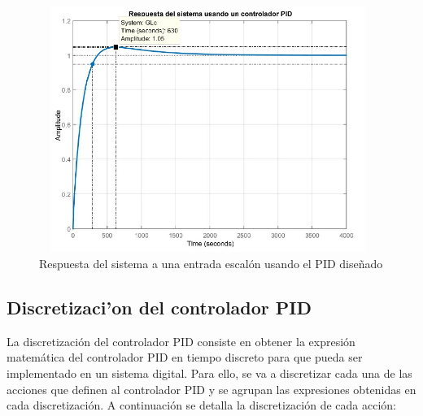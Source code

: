 \begin{figure}[H]
  \centering
  \includegraphics[width=110mm, height=80mm]{imagenes/capitulo4/4_6Resp_Lazo_Cerrado}
   \caption{Respuesta del sistema a una entrada escalón usando el PID diseñado}
   \label{4_6:resp_simulacion}
\end{figure}

\subsection{Discretizaci'on del controlador PID}\label{subsec:discretizacionPID}

	La discretización del controlador PID consiste en obtener la expresión matemática del controlador PID en tiempo discreto para que pueda ser implementado en un sistema digital. Para ello, se va a discretizar cada una de las acciones que definen al controlador PID y se agrupan las expresiones obtenidas en cada discretización. A continuación se detalla la discretización de cada acción:

